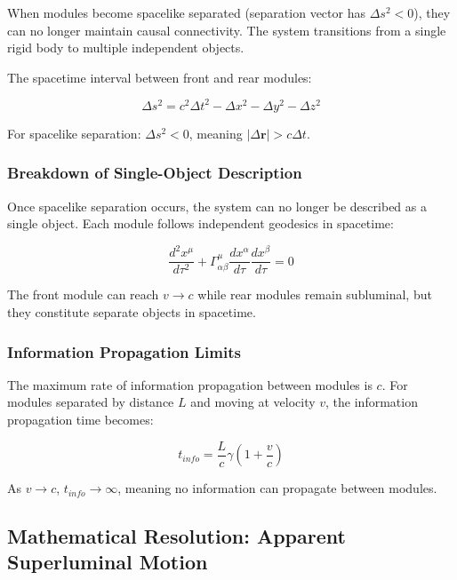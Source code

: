 \documentclass[11pt,a4paper]{article}
\theoremstyle{remark}
\begin{document}
When modules become spacelike separated (separation vector has $\Delta s^2 < 0$), they can no longer maintain causal connectivity. The system transitions from a single rigid body to multiple independent objects.

The spacetime interval between front and rear modules:

\begin{equation}
\Delta s^2 = c^2 \Delta t^2 - \Delta x^2 - \Delta y^2 - \Delta z^2
\label{eq:spacetime_interval}
\end{equation}

For spacelike separation: $\Delta s^2 < 0$, meaning $|\Delta \mathbf{r}| > c \Delta t$.

\subsubsection{Breakdown of Single-Object Description}

Once spacelike separation occurs, the system can no longer be described as a single object. Each module follows independent geodesics in spacetime:

\begin{equation}
\frac{d^2 x^\mu}{d\tau^2} + \Gamma^\mu_{\alpha\beta} \frac{dx^\alpha}{d\tau} \frac{dx^\beta}{d\tau} = 0
\label{eq:geodesic_equation}
\end{equation}

The front module can reach $v \to c$ while rear modules remain subluminal, but they constitute separate objects in spacetime.

\subsubsection{Information Propagation Limits}

The maximum rate of information propagation between modules is $c$. For modules separated by distance $L$ and moving at velocity $v$, the information propagation time becomes:

\begin{equation}
t_{info} = \frac{L}{c} \gamma \left(1 + \frac{v}{c}\right)
\label{eq:information_time}
\end{equation}

As $v \to c$, $t_{info} \to \infty$, meaning no information can propagate between modules.

\subsection{Mathematical Resolution: Apparent Superluminal Motion}
\end{document}
